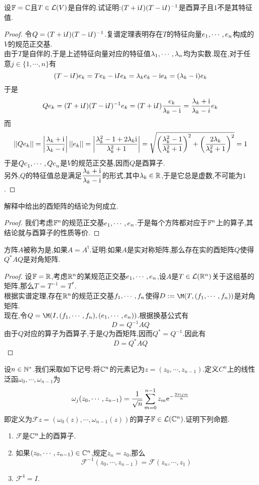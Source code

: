 \documentclass{ctexart}
\begin{document}
\begin{problem}[16.]
    设$\mathbb{F}=\mathbb{C}$且$T\in\mathcal{L}(V)$是自伴的.试证明:$(T+\text{i} I)(T-\text{i} I)^{-1}$是酉算子且$1$不是其特征值.
\end{problem}
\begin{proof}
    令$Q=(T+\text{i} I)(T-\text{i} I)^{-1}$.复谱定理表明存在$T$的特征向量${e}_1,\cdots,{e}_{n}$构成的$V$的规范正交基.\\
    由于$T$是自伴的,于是上述特征向量对应的特征值${\lambda}_1,\cdots,{\lambda}_{n}$均为实数.现在,对于任意$j\in\{1,\cdots,n\}$有
    \[(T-\text{i} I)e_k=Te_k-\text{i} Ie_k=\lambda_ke_k-\text{i} e_k=(\lambda_k-\text{i})e_k\]
    于是
    \[Qe_k=(T+\text{i} I)(T-\text{i} I)^{-1}e_k=(T+\text{i} I)\dfrac{e_k}{\lambda_k-\text{i}}=\dfrac{\lambda_k+\text{i}}{\lambda_k-i}e_k\]
    而
    \[||Qe_k||=\left|\dfrac{\lambda_k+\text{i}}{\lambda_k-i}\right|||e_k||=\left|\dfrac{\lambda_k^2-1+2\lambda_k\text{i}}{\lambda_k^2+1}\right|
    =\sqrt{\left(\dfrac{\lambda_k^2-1}{\lambda_k^2+1}\right)^2+\left(\dfrac{2\lambda_k}{\lambda_k^2+1}\right)^2}=1\]
    于是${Qe}_1,\cdots,{Qe}_{n}$是$V$的规范正交基,因而$Q$是酉算子.\\
    另外,$Q$的特征值总是满足$\dfrac{\lambda_k+\text{i}}{\lambda_k-\text{i}}$的形式,其中$\lambda_k\in\mathbb{R}$,于是它总是虚数,不可能为$1$.
\end{proof}
\begin{problem}[17.]
    解释中给出的酉矩阵的结论为何成立.
\end{problem}
\begin{proof}
    我们考虑$\mathbb{F}^n$的规范正交基${e}_1,\cdots,{e}_{n}$.于是每个方阵都对应于$\mathbb{F}^n$上的算子,其结论就与酉算子的性质等价.
\end{proof}
\begin{problem}[18.]
    方阵$A$被称为是,如果$A=A^\text{t}$.证明:如果$A$是实对称矩阵,那么存在实的酉矩阵$Q$使得$Q^*AQ$是对角矩阵.
\end{problem}
\begin{proof}
    设$\mathbb{F}=\mathbb{R}$,考虑$\mathbb{R}^n$的某规范正交基${e}_1,\cdots,{e}_{n}$,设$A$是$T\in\mathcal{L}(\mathbb{R}^n)$关于这组基的矩阵,那么$T=T^{-1}=T^*$.\\
    根据实谱定理,存在$\mathbb{R}^n$的规范正交基${f}_1,\cdots,{f}_{n}$使得$D:=\M(T,(\li f,n))$是对角矩阵.\\
    现在,令$Q=\M(I,(\li f,n),(\li e,n))$.根据换基公式有
    \[D=Q^{-1}AQ\]
    由于$Q$对应的算子为酉算子,于是$Q$为酉矩阵,因而$Q^*=Q^{-1}$.因此有
    \[D=Q^*AQ\]
\end{proof}
\begin{problem}[19.]
    设$n\in\mathbb{N}^*$.我们采取如下记号:将$\mathbb{C}^n$的元素记为$z=(z_0,\cdots,z_{n-1})$.定义$C^n$上的线性泛函$\omega_0,\cdots,\omega_{n-1}$为
    \[\omega_j(z_0,\cdots,z_{n-1})=\dfrac{1}{\sqrt{n}}\sum_{m=0}^{n-1}z_m\mathrm{e}^{-\frac{2\pi\text{i} jm}{n}}\]
    即定义为$\mathcal{F}z=\left(\omega_0(z),\cdots,\omega_{n-1}(z)\right)$的算子$\mathbb{F}\in\mathcal{L}(\mathbb{C}^n)$.证明下列命题.
    \begin{enumerate}[label=\tbf{(\arabic*)}]
        \item $\mathcal{F}$是$\mathbb{C}^n$上的酉算子.
        \item 如果$(z_0,\cdots,z_{n-1})\in\mathbb{C}^n$,规定$z_n=z_0$,那么
            \[\mathcal{F}^{-1}(z_0,\cdots,z_{n-1})=\mathcal{F}(z_n,\cdots,z_1)\]
        \item $\mathcal{F}^4=I$.
    \end{enumerate}
\end{problem}
\end{document}
